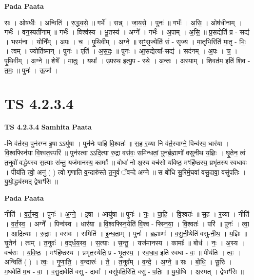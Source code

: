 \documentclass[17pt]{extarticle}
\begin{document}
\textbf{Pada Paata} \newline

सः । ओष॑धीः । अन्विति॑ । रु॒द्ध्य॒से॒ ॥ गर्भे᳚ । सन्न् । जा॒य॒से॒ । पुनः॑ ॥ गर्भः॑ । अ॒सि॒ । ओष॑धीनाम् । गर्भः॑ । वन॒स्पती॑नाम् ॥ गर्भः॑ । विश्व॑स्य । भू॒तस्य॑ । अग्ने᳚ । गर्भः॑ । अ॒पाम् । अ॒सि॒ ॥ प्र॒सद्येति॑ प्र - सद्य॑ । भस्म॑ना । योनि᳚म् । अ॒पः । च॒ । पृ॒थि॒वीम् । अ॒ग्ने॒ ॥ सꣳ॒॒सृज्येति॑ सं - सृज्य॑ । मा॒तृभि॒रिति॑ मा॒तृ - भिः॒ । त्वम् । ज्योति॑ष्मान् । पुनः॑ । एति॑ । अ॒स॒दः॒ ॥ पुनः॑ । आ॒सद्येत्या᳚-सद्य॑ । सद॑नम् । अ॒पः । च॒ । पृ॒थि॒वीम् । अ॒ग्ने॒ ॥ शेषे᳚ । मा॒तुः । यथा᳚ । उ॒पस्थ॒ इत्यु॒प - स्थे॒ । अ॒न्तः । अ॒स्याम् । शि॒वत॑म॒ इति॑ शि॒व - त॒मः॒ ॥ पुनः॑ । ऊ॒र्जा ।  \newline





\section{ TS 4.2.3.4 }

\textbf{TS 4.2.3.4 } \newline
\textbf{Samhita Paata} \newline

-नि व॑र्तस्व॒ पुन॑रग्न इ॒षा ऽऽयु॑षा । पुन॑र्नः पाहि वि॒श्वतः॑ ॥ स॒ह र॒य्या नि व॑र्त॒स्वाग्ने॒ पिन्व॑स्व॒ धार॑या । वि॒श्वफ्स्नि॑या वि॒श्वत॒स्परि॑ ॥ पुन॑स्त्वा ऽऽदि॒त्या रु॒द्रा वस॑वः॒ समि॑न्धतां॒ पुन॑र्ब्र॒ह्माणो॑ वसुनीथ य॒ज्ञिः । घृ॒तेन॒ त्वं त॒नुवो॑ वर्द्धयस्व स॒त्याः स॑न्तु॒ यज॑मानस्य॒ कामाः᳚ ॥ बोधा॑ नो अ॒स्य वच॑सो यविष्ठ॒ मꣳहि॑ष्ठस्य॒ प्रभृ॑तस्य स्वधावः । पीय॑ति त्वो॒ अनु॑ ( ) त्वो गृणाति व॒न्दारु॑स्ते त॒नुवं॑ ॅवन्दे अग्ने ॥ स बो॑धि सू॒रिर्म॒घवा॑ वसु॒दावा॒ वसु॑पतिः । यु॒यो॒द्ध्य॑स्मद् द्वेषाꣳ॑सि ॥ \newline

\textbf{Pada Paata} \newline

नीति॑ । व॒र्त॒स्व॒ । पुनः॑ । अ॒ग्ने॒ । इ॒षा । आयु॑षा ॥ पुनः॑ । नः॒ । पा॒हि॒ । वि॒श्वतः॑ ॥ स॒ह । र॒य्या । नीति॑ । व॒र्त॒स्व॒ । अग्ने᳚ । पिन्व॑स्व । धार॑या ॥ वि॒श्वफ्स्नि॒येति॑ वि॒श्व - फ्स्नि॒या॒ । वि॒श्वतः॑ । परि॑ ॥ पुनः॑ । त्वा॒ । आ॒दि॒त्याः । रु॒द्राः । वस॑वः । समिति॑ । इ॒न्ध॒ता॒म् । पुनः॑ । ब्र॒ह्माणः॑ । व॒सु॒नी॒थेति॑ वसु-नी॒थ॒ । य॒ज्ञिः ॥ घृ॒तेन॑ । त्वम् । त॒नुवः॑ । व॒द्‌र्ध॒य॒स्व॒ । स॒त्याः । स॒न्तु॒ । यज॑मानस्य । कामाः᳚ ॥ बोध॑ । नः॒ । अ॒स्य । वच॑सः । य॒वि॒ष्ठ॒ । मꣳहि॑ष्ठस्य । प्रभृ॑त॒स्येति॒ प्र - भृ॒त॒स्य॒ । स्व॒धा॒व॒ इति॑ स्वधा - वः॒ ॥ पीय॑ति । त्वः॒ । अन्विति॑ ( ) । त्वः॒ । गृ॒णा॒ति॒ । व॒न्दारुः॑ । ते॒ । त॒नुव᳚म् । व॒न्दे॒ । अ॒ग्ने॒ ॥ सः । बो॒धि॒ । सू॒रिः । म॒घवेति॑ म॒घ - वा॒ । व॒सु॒दावेति॑ वसु - दावा᳚ । वसु॑पति॒रिति॒ वसु॑ - प॒तिः॒ ॥ यु॒यो॒धि । अ॒स्मत् । द्वेषाꣳ॑सि ॥  \newline
\end{document}
